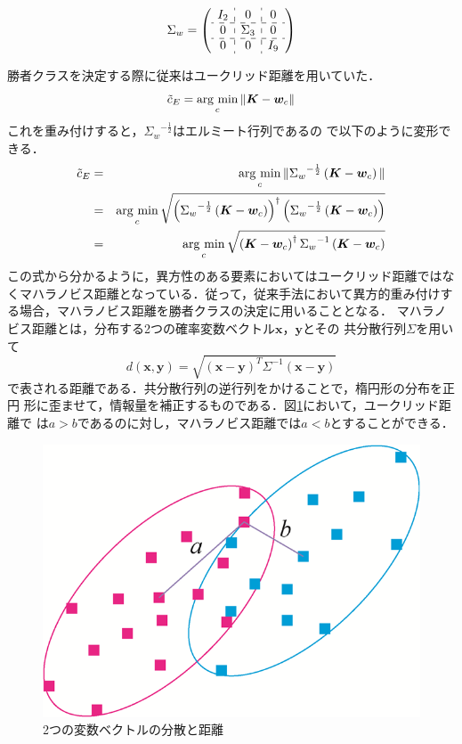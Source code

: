 ﻿\documentclass[12pt,oneside]{jsbook}
\newcommand{\argmin}{\mathop{\rm arg~min}\limits}
\begin{document}
\begin{equation}
\Sigma_w = \left(\begin{array}{c:c:c}
	   I_2&\Large{0} &\Large{0} \\
\hdashline %
\Large{0} &\Sigma_3& \Large{0}\\
\hdashline %
\Large{0}&\Large{0} &I_9
		\end{array}
\right) 
\end{equation}

勝者クラスを決定する際に従来はユークリッド距離を用いていた．
\begin{equation}
\tilde{c}_E = \argmin_{c} \|{\bm K} - {\bm w_c} \|\label{192027_15Feb15}
\end{equation}
これを重み付けすると，${\Sigma_w}^{-\frac{1}{2}}$はエルミート行列であるの
で以下のように変形できる．
\begin{eqnarray}
\tilde{c}_E&=&\argmin_{c} \|{\Sigma_w}^{-\frac{1}{2}}\left({\bm K} -
						      {\bm w_c}\right)\|\\
 &=&\argmin_{c} \sqrt{\left({\Sigma_w}^{-\frac{1}{2}}\left({\bm K} -
						      {\bm w_c}\right)
		      \right)^{\dagger}
                \left({\Sigma_w}^{-\frac{1}{2}}\left({\bm K} - {\bm
						w_c}\right)\right)}\\
 &=&\argmin_{c} \sqrt{\left({\bm K} - {\bm w_c}\right)^{\dagger}
    {\Sigma_w}^{-1}\left({\bm K} - {\bm w_c}\right)}
\end{eqnarray}
この式から分かるように，異方性のある要素においてはユークリッド距離ではな
くマハラノビス距離となっている．従って，従来手法において異方的重み付けす
る場合，マハラノビス距離を勝者クラスの決定に用いることとなる．
マハラノビス距離とは，分布する2つの確率変数ベクトル${\bm x}，{\bm y}$とその
共分散行列$\Sigma$を用いて
\[
 d({\bm x},{\bm y}) = \sqrt{\left({\bm x}-{\bm
 y}\right)^T\Sigma^{-1}\left({\bm x}-{\bm y}\right)}
\]
で表される距離である．共分散行列の逆行列をかけることで，楕円形の分布を正円
形に歪ませて，情報量を補正するものである．図\ref{maha}において，ユークリッド距離で
は$a>b$であるのに対し，マハラノビス距離では$a<b$とすることができる．

\begin{figure}[btp]
 \begin{center}
\includegraphics[width =0.6\hsize ]{maha.png}
\caption{2つの変数ベクトルの分散と距離}
\label{maha}
  \end{center}
\end{figure}
\end{document}
